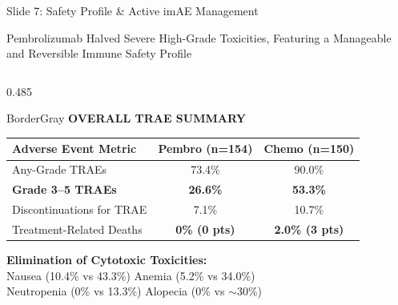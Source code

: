 \documentclass[aspectratio=169,10pt]{beamer}
\begin{document}
\begin{frame}{Slide 7: Safety Profile \& Active imAE Management}
\begin{actionbanner}
Pembrolizumab Halved Severe High-Grade Toxicities, Featuring a Manageable and Reversible Immune Safety Profile
\end{actionbanner}

\vspace{2pt}

\begin{columns}[T]
  \begin{column}{0.485\textwidth}
    \begin{statcard}{BorderGray}
      {\scriptsize\textbf{\color{DeepNavy}OVERALL TRAE SUMMARY}}
      \vskip 2pt
      \tiny
      \begin{tabular}{lcc}
        \toprule
        \textbf{Adverse Event Metric} & \textbf{Pembro (n=154)} & \textbf{Chemo (n=150)} \\
        \midrule
        Any-Grade TRAEs & 73.4\% & 90.0\% \\
        \textbf{Grade 3--5 TRAEs} & \textbf{26.6\%} & \textbf{53.3\%} \\
        Discontinuations for TRAE & 7.1\% & 10.7\% \\
        Treatment-Related Deaths & \textbf{0\% (0 pts)} & \textbf{2.0\% (3 pts)} \\
        \bottomrule
      \end{tabular}
      \vskip 3pt
      \textbf{Elimination of Cytotoxic Toxicities:}\\
      Nausea (10.4\% vs 43.3\%) \quad Anemia (5.2\% vs 34.0\%)\\
      Neutropenia (0\% vs 13.3\%) \quad Alopecia (0\% vs $\sim$30\%)
    \end{statcard}
  \end{column}


\end{columns}
\end{frame}
\end{document}
